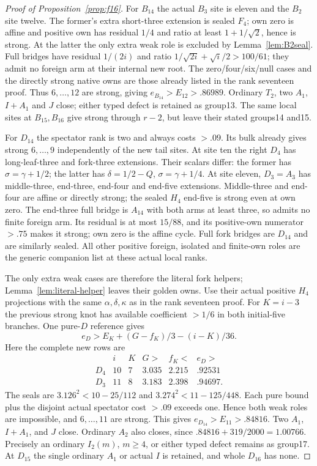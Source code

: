 \documentclass[11pt]{article}
\begin{document}
\begin{proof}[Proof of Proposition~\ref{prop:f16}]
For $B_{14}$ the actual $B_3$ site is eleven and the $B_2$ site
twelve. The former's extra short-three extension is sealed $F_4$;
own zero is affine and positive own has residual $1/4$ and ratio
at least $1+1/\sqrt2$, hence is strong. At the latter the only extra
weak role is excluded by Lemma~\ref{lem:B2seal}. Full bridges have
residual $1/(2i)$ and ratio
$1/\sqrt{2i}+\sqrt i/2>100/61$; they admit no foreign arm at
their internal new root. The zero/four/six/null cases and the directly
strong native owns are those already listed in the rank seventeen proof.
Thus $6,\ldots,12$ are strong, giving $e_{B_{14}}>E_{12}>.86989$.
Ordinary $T_2$, two $A_1$, $I+A_1$ and $J$ close; either typed
defect is retained as group13. The same local sites at $B_{15},B_{16}$
give strong through $r-2$, but leave their stated groups14 and15.

For $D_{14}$ the spectator rank is two and always costs $>.09$.
Its bulk already gives strong $6,\ldots,9$ independently of the
new tail sites. At site ten the right $D_4$ has long-leaf-three and
fork-three extensions. Their scalars differ: the former has
$\sigma=\gamma+1/2$; the latter has
$\delta=1/2-Q$, $\sigma=\gamma+1/4$.
At site eleven, $D_3=A_3$ has middle-three, end-three, end-four and
end-five extensions. Middle-three and end-four are affine or directly
strong; the sealed $H_4$ end-five is strong even at own zero.
The end-three full bridge is $A_{14}$ with both arms at least three,
so admits no finite foreign arm. Its residual is at most $15/88$,
and its positive-own numerator $>.75$ makes it strong; own zero is
the affine cycle. Full fork bridges are $D_{14}$ and are similarly
sealed. All other positive foreign, isolated and finite-own roles are
the generic companion list at these actual local ranks.

The only extra weak cases are therefore the literal fork helpers;
Lemma~\ref{lem:literal-helper} leaves their golden owns.
Use their actual positive $H_4$ projections with the same
$\alpha,\delta,\kappa$ as in the rank seventeen proof. For $K=i-3$ the
previous strong knot has available coefficient $>1/6$ in both
initial-five branches. One pure-$D$ reference gives
\[
 e_D>E_K+(G-f_K)/3-(i-K)/36.
\]
Here the complete new rows are
\[
\begin{array}{c|rrrr|c}
 &i&K&G>&f_K<&e_D>\\\hline
D_4&10&7&3.035&2.215&.92531\\
D_3&11&8&3.183&2.398&.94697.
\end{array}
\]
The seals are $3.126^2<10-25/112$ and
$3.274^2<11-125/448$. Each pure bound plus the disjoint actual
spectator cost $>.09$ exceeds one. Hence both weak roles are
impossible, and $6,\ldots,11$ are strong. This gives
$e_{D_{14}}>E_{11}>.84816$.
Two $A_1$, $I+A_1$, and $J$ close. Ordinary $A_2$ also closes,
since $.84816+319/2000=1.00766$.
Precisely an ordinary $I_2(m)$, $m\ge4$, or either typed defect
remains as group17. At $D_{15}$ the single ordinary $A_1$ or
actual $I$ is retained, and whole $D_{16}$ has none.


\end{proof}
\end{document}
